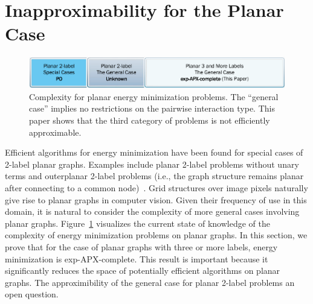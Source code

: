 \section{Inapproximability for the Planar Case} \label{sec:plcase}

\begin{figure}[b]
\begin{center}
   \includegraphics[width=1\linewidth]{figure/PlanarComplexity.pdf}
\end{center}
   \caption{Complexity for planar energy minimization problems. The ``general case'' implies no restrictions on the pairwise interaction type.  This paper shows that the third category of problems is not efficiently approximable.}
\label{fig:planarcomp}
\end{figure}

Efficient algorithms for energy minimization have been found for special cases of 2-label planar graphs.  Examples include planar 2-label problems without unary terms and outerplanar 2-label problems (i.e., the graph structure remains planar after connecting to a common node)~\cite{Schraudolph-10}. 
Grid structures over image pixels naturally give rise to planar graphs in computer vision.  Given their frequency of use in this domain, it is natural to consider the complexity of more general cases involving planar graphs. Figure~\ref{fig:planarcomp} visualizes the current state of knowledge  of the complexity of energy minimization problems on planar graphs.  In this section, we prove that for the case of planar graphs with three or more labels, energy minimization is exp-APX-complete. This result is important because it significantly reduces the space of potentially efficient algorithms on planar graphs.  The approximibility of the general case for planar 2-label problems an open question.

